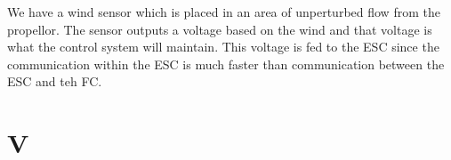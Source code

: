 \documentclass[twocolumn]{article}
\begin{document}
We have a wind sensor which is placed in an area of unperturbed flow from the propellor. The sensor outputs a voltage based on the wind and that voltage is what the control system will maintain. This voltage is fed to the ESC since the communication within the ESC is much faster than communication between the ESC and teh FC.  


\section{V}

\end{document}
